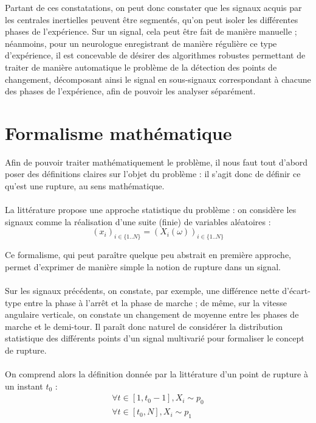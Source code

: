 \documentclass[french,12pt,notitlepage]{report}
\begin{document}
	\vspace{1pc}
	
	Partant de ces constatations, on peut donc constater que les signaux acquis par les centrales inertielles peuvent être segmentés, qu'on peut isoler les différentes phases de l'expérience. Sur un signal, cela peut être fait de manière manuelle ; néanmoins, pour un neurologue enregistrant de manière régulière ce type d'expérience, il est concevable de désirer des algorithmes robustes permettant de traiter de manière automatique le problème de la détection des points de changement, décomposant ainsi le signal en sous-signaux correspondant à chacune des phases de l'expérience, afin de pouvoir les analyser séparément.
	
	\section{Formalisme mathématique}
	Afin de pouvoir traiter mathématiquement le problème, il nous faut tout d'abord poser des définitions claires sur l'objet du problème : il s'agit donc de définir ce qu'est une rupture, au sens mathématique.
	\\ \\
	La littérature propose une approche statistique du problème : on considère les signaux comme la réalisation d'une suite (finie) de variables aléatoires :
	\begin{equation}
		(x_i)_{i \in \{1..N\}} = (X_i(\omega))_{i \in \{1..N\}}
		\label{11}
	\end{equation}
	
	Ce formalisme, qui peut paraître quelque peu abstrait en première approche, permet d'exprimer de manière simple la notion de rupture dans un signal.
	\\ \\
	Sur les signaux précédents, on constate, par exemple, une différence nette d'écart-type entre la phase à l'arrêt et la phase de marche ; de même, sur la vitesse angulaire verticale, on constate un changement de moyenne entre les phases de marche et le demi-tour. Il paraît donc naturel de considérer la distribution statistique des différents points d'un signal multivarié pour formaliser le concept de rupture.
	\\ \\
	On comprend alors la définition donnée par la littérature d'un point de rupture à un instant $t_0$ :
	\begin{equation}
	\begin{array}{ll}
			\forall t \in [1, t_0-1], X_i \sim p_0 \\
			 \forall t \in [t_0, N], X_i \sim p_1 \\
	\end{array}
	\end{equation}
	
\end{document}
